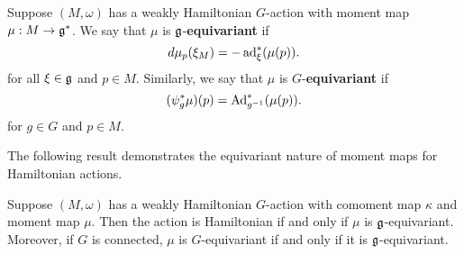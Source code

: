 \documentclass{amsart}
\begin{document}
\begin{definition}
    Suppose $(M,\omega)$ has a weakly Hamiltonian $G$-action with moment map $\mu:M\to\mathfrak g^*$.
    We say that $\mu$ is $\mathfrak g$-\textbf{equivariant} if
    \begin{equation*}
        d\mu_p(\xi_M) = -\operatorname{ad}_\xi^*(\mu(p)).
    \end{equation*}
    for all $\xi\in\mathfrak g$ and $p\in M$. Similarly, we say that $\mu$ is $G$-\textbf{equivariant} if
    \begin{equation*}
        (\psi_g^*\mu)(p) = \operatorname{Ad}^*_{g^{-1}}(\mu(p)).
    \end{equation*}
    for $g\in G$ and $p\in M$.
\end{definition}

The following result demonstrates the equivariant nature of moment maps for Hamiltonian actions.
\begin{proposition}
    Suppose $(M,\omega)$ has a weakly Hamiltonian $G$-action with comoment map $\kappa$ and
    moment map $\mu$. Then the action is Hamiltonian if and only if $\mu$ is $\mathfrak g$-equivariant.
    Moreover, if $G$ is connected, $\mu$ is $G$-equivariant if and only if it is $\mathfrak g$-equivariant.
\end{proposition}
\end{document}
